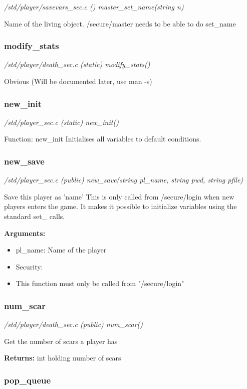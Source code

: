 {\em /std/player/savevars\_sec.c () master\_set\_name(string n)}

Name of the living object.
/secure/master needs to be able to do set\_name


\subsubsection{modify\_stats}

{\em /std/player/death\_sec.c (static) modify\_stats()}

Obvious (Will be documented later, use man -s)


\subsubsection{new\_init}

{\em /std/player\_sec.c (static) new\_init()}

Function:     new\_init
Initialises all variables to default conditions.


\subsubsection{new\_save}

{\em /std/player\_sec.c (public) new\_save(string pl\_name, string pwd, string pfile)}

Save this player as 'name'
This is only called from /secure/login when new players
enters the game. It makes it possible to initialize variables
using the standard set\_ calls.

{\bf Arguments:}
\begin{itemize}
\item     pl\_name: Name of the player
\item Security:
\item This function must only be called from "/secure/login"
\end{itemize}


\subsubsection{num\_scar}

{\em /std/player/death\_sec.c (public) num\_scar()}

Get the number of scars a player has

{\bf Returns:}        int holding number of scars


\subsubsection{pop\_queue}

